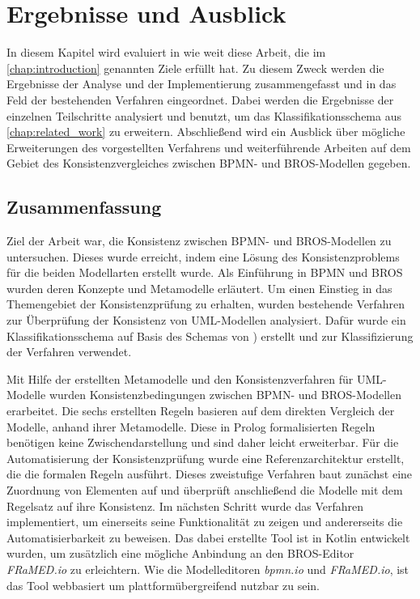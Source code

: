 \chapter{Ergebnisse und Ausblick}
\label{chap:conclusion}

In diesem Kapitel wird evaluiert in wie weit diese Arbeit, die im \cref{chap:introduction} genannten Ziele erfüllt hat.
Zu diesem Zweck werden die Ergebnisse der Analyse und der Implementierung zusammengefasst und in das Feld der bestehenden Verfahren eingeordnet.
Dabei werden die Ergebnisse der einzelnen Teilschritte analysiert und benutzt, um das Klassifikationsschema aus \cref{chap:related_work} zu erweitern.
Abschließend wird ein Ausblick über mögliche Erweiterungen des vorgestellten Verfahrens und weiterführende Arbeiten auf dem Gebiet des Konsistenzvergleiches zwischen BPMN- und BROS-Modellen gegeben.

\section{Zusammenfassung}

Ziel der Arbeit war, die Konsistenz zwischen BPMN- und BROS-Modellen zu untersuchen.
Dieses wurde erreicht, indem eine Lösung des Konsistenzproblems für die beiden Modellarten erstellt wurde.
Als Einführung in BPMN und BROS wurden deren Konzepte und Metamodelle erläutert.
Um einen Einstieg in das Themengebiet der Konsistenzprüfung zu erhalten, wurden bestehende Verfahren zur Überprüfung der Konsistenz von UML-Modellen analysiert.
Dafür wurde ein Klassifikationsschema auf Basis des Schemas von \cite{Usman2008}) erstellt und zur Klassifizierung der Verfahren verwendet.

Mit Hilfe der erstellten Metamodelle und den Konsistenzverfahren für UML-Modelle wurden Konsistenzbedingungen zwischen BPMN- und BROS-Modellen erarbeitet.
Die sechs erstellten Regeln basieren auf dem direkten Vergleich der Modelle, anhand ihrer Metamodelle.
Diese in Prolog formalisierten Regeln benötigen keine Zwischendarstellung und sind daher leicht erweiterbar.
Für die Automatisierung der Konsistenzprüfung wurde eine Referenzarchitektur erstellt, die die formalen Regeln ausführt.
Dieses zweistufige Verfahren baut zunächst eine Zuordnung von Elementen auf und überprüft anschließend die Modelle mit dem Regelsatz auf ihre Konsistenz.
Im nächsten Schritt wurde das Verfahren implementiert, um einerseits seine Funktionalität zu zeigen und andererseits die Automatisierbarkeit zu beweisen.
Das dabei erstellte Tool ist in Kotlin entwickelt wurden, um zusätzlich eine mögliche Anbindung an den BROS-Editor \emph{FRaMED.io} zu erleichtern.
Wie die Modelleditoren \emph{bpmn.io} und \emph{FRaMED.io}, ist das Tool webbasiert um plattformübergreifend nutzbar zu sein.

